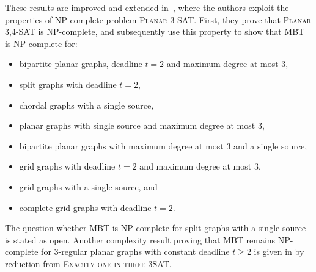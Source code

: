 These results are improved and extended in~\cite{jansen93}, where the authors exploit the properties of NP-complete problem \textsc{Planar 3-SAT}.
First, they prove that \textsc{Planar 3,4-SAT} is NP-complete, and subsequently use this property to show that MBT is NP-complete for:
\begin{itemize}
\item bipartite planar graphs, deadline $t=2$ and maximum degree at most 3,
\item split graphs with deadline $t=2$,
\item chordal graphs with a single source, 
\item planar graphs with single source and maximum degree at most 3, 
\item bipartite planar graphs with maximum degree at most 3 and a single source,
\item grid graphs with deadline $t=2$ and maximum degree at most 3,
\item grid graphs with a single source, and
\item complete grid graphs with deadline $t=2$. 
\end{itemize}
The question whether MBT is NP complete for split graphs with a single source is stated as open.
Another complexity result proving that MBT remains NP-complete for 3-regular planar graphs with constant deadline $t\geq 2$ 
is given in \cite{middendorf93} by reduction from \textsc{Exactly-one-in-three-3SAT}.

